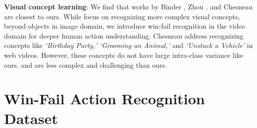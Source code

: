 \documentclass[final]{cvpr}
\begin{document}
\noindent\textbf{Visual concept learning}: We find that works by Binder \etal \cite{binder2014machine}, Zhou \etal  \cite{zhou2014learning}, and Chesneau \etal \cite{chesneau2017learning} are closest to ours. While \cite{binder2014machine, zhou2014learning} focus on recognizing more complex visual concepts, beyond objects in image domain, we introduce win-fail recognition in the video domain for deeper human action understanding. Chesneau \etal \cite{chesneau2017learning} address recognizing concepts like \textit{`Birthday Party,'} \textit{`Grooming an Animal,'} and \textit{`Unstuck a Vehicle'} in web videos. However, these concepts do not have large intra-class variance like ours, and are less complex and challenging than ours. \section{Win-Fail Action Recognition Dataset}
\label{sec:dataset}
\end{document}

